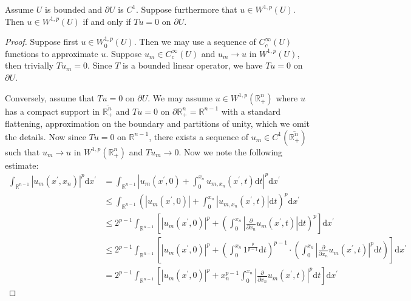 \begin{theorem}
Assume $U$ is bounded and $\partial U$ is $C^1$. Suppose furthermore that $u\in W^{1,p}(U)$. Then $u\in W^{1,p}(U)$ if and only if $Tu=0$ on $\partial U$.
\end{theorem}
\begin{proof}
Suppose first $u\in W_0^{1,p}(U)$. Then we may use a sequence of $C_c^\infty(U)$ functions to approximate $u$. Suppose $u_m\in C_c^\infty(U)$ and $u_m\to u$ in $W^{1,p}(U)$, then trivially $Tu_m=0$. Since $T$ is a bounded linear operator, we have $Tu=0$ on $\partial U$.\par
Conversely, assume that $Tu=0$ on $\partial U$. We may assume $u\in W^{1,p}(\mathbb{R}_+^n)$ where $u$ has a compact support in $\overline{\mathbb{R}_+^n}$ and $Tu=0$ on $\partial\mathbb{R}_+^n=\mathbb{R}^{n-1}$ with a standard flattening, approximation on the boundary and partitions of unity, which we omit the details. Now since $Tu=0$ on $\mathbb{R}^{n-1}$, there exists a sequence of $u_m\in C^1(\overline{\mathbb{R}_+^n})$ such that $u_m\to u$ in $W^{1,p}(\mathbb{R}_+^n)$ and $Tu_m\to 0$. Now we note the following estimate: 
$$
\begin{aligned}
\int_{\mathbb{R} ^{n-1}}{\left| u_m\left( x^{\prime},x_n \right) \right|^p\mathrm{d}x^{\prime}}&=\int_{\mathbb{R} ^{n-1}}{\left| u_m\left( x^{\prime},0 \right) +\int_0^{x_n}{u_{m,x_n}\left( x^{\prime},t \right) \mathrm{d}t} \right|^p\mathrm{d}x^{\prime}}
\\
&\le \int_{\mathbb{R} ^{n-1}}{\left( \left| u_m\left( x^{\prime},0 \right) \right|+\int_0^{x_n}{\left| u_{m,x_n}\left( x^{\prime},t \right) \right|\mathrm{d}t} \right) ^p\mathrm{d}x^{\prime}}
\\
&\le 2^{p-1}\int_{\mathbb{R} ^{n-1}}{\left[ \left| u_m\left( x^{\prime},0 \right) \right|^p+\left( \int_0^{x_n}{\left| \frac{\partial}{\partial x_n}u_m\left( x^{\prime},t \right) \right|\mathrm{d}t} \right) ^p \right] \mathrm{d}x^{\prime}}
\\
&\le 2^{p-1}\int_{\mathbb{R} ^{n-1}}{\left[ \left| u_m\left( x^{\prime},0 \right) \right|^p+\left( \int_0^{x_n}{1^{\frac{p}{p-1}}\mathrm{d}t} \right) ^{p-1}\cdot \left( \int_0^{x_n}{\left| \frac{\partial}{\partial x_n}u_m\left( x^{\prime},t \right) \right|^p\mathrm{d}t} \right) \right] \mathrm{d}x^{\prime}}
\\
&=2^{p-1}\int_{\mathbb{R} ^{n-1}}{\left[ \left| u_m\left( x^{\prime},0 \right) \right|^p+x_{n}^{p-1}\int_0^{x_n}{\left| \frac{\partial}{\partial x_n}u_m\left( x^{\prime},t \right) \right|^p\mathrm{d}t} \right] \mathrm{d}x^{\prime}}

\end{aligned}$$
\end{proof}
